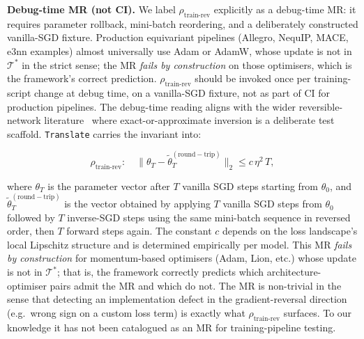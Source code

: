 \documentclass[acmsmall, screen]{acmart}
\begin{document}
\textbf{Debug-time MR (not CI).} We label $\rho_{\mathrm{train\text{-}rev}}$ explicitly as a debug-time MR: it requires parameter rollback, mini-batch reordering, and a deliberately constructed vanilla-SGD fixture. Production equivariant pipelines (Allegro, NequIP, MACE, e3nn examples) almost universally use Adam or AdamW, whose update is not in $\mathcal{T}^{*}$ in the strict sense; the MR \emph{fails by construction} on those optimisers, which is the framework's correct prediction. $\rho_{\mathrm{train\text{-}rev}}$ should be invoked once per training-script change at debug time, on a vanilla-SGD fixture, not as part of CI for production pipelines. The debug-time reading aligns with the wider reversible-network literature~\cite{Gomez2017Reversible} where exact-or-approximate inversion is a deliberate test scaffold. \texttt{Translate} carries the invariant into:

\begin{equation}
\rho_{\mathrm{train\text{-}rev}}: \quad \big\| \theta_T - \tilde\theta_T^{\mathrm{(round-trip)}} \big\|_2 \le c\,\eta^{2}\,T,
\end{equation}

\noindent where $\theta_T$ is the parameter vector after $T$ vanilla SGD steps starting from $\theta_0$, and $\tilde\theta_T^{\mathrm{(round-trip)}}$ is the vector obtained by applying $T$ vanilla SGD steps from $\theta_0$ followed by $T$ inverse-SGD steps using the same mini-batch sequence in reversed order, then $T$ forward steps again. The constant $c$ depends on the loss landscape's local Lipschitz structure and is determined empirically per model. This MR \emph{fails by construction} for momentum-based optimisers (Adam, Lion, etc.) whose update is not in $\mathcal{T}^{*}$; that is, the framework correctly predicts which architecture-optimiser pairs admit the MR and which do not. The MR is non-trivial in the sense that detecting an implementation defect in the gradient-reversal direction (e.g.\ wrong sign on a custom loss term) is exactly what $\rho_{\mathrm{train\text{-}rev}}$ surfaces. To our knowledge it has not been catalogued as an MR for training-pipeline testing.
\end{document}
